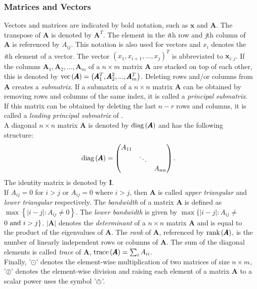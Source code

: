 \documentclass[12pt]{book}
\begin{document}
\subsubsection*{Matrices and Vectors}
Vectors and matrices are indicated by bold notation, such as $\pmb{x}$ and $\pmb{A}$. The transpose of $\pmb{A}$ is denoted by $\pmb{A}^T$. The element in the \textit{i}th row and \textit{j}th column of $\pmb{A}$ is referenced by $A_{ij}$. This notation is also used for vectors and $x_i$ denotes the \textit{i}th element of a vector. The vector $\left(x_1,x_{i+1},...,x_j\right)^T$ is abbreviated to $\pmb{x}_{i:j}$. If the columns $\pmb{A}_1, \pmb{A}_2,...,\pmb{A}_m$ of a $n\times m$ matrix $\pmb{A}$ are stacked on top of each other, this is denoted by $\hbox{vec}\left(\pmb{A}\right)=\left(\pmb{A}_1^T,\pmb{A}_2^2,...,\pmb{A}_m^T\right)$. Deleting rows and/or columns from $\pmb{A}$ creates a \textit{submatrix}. If a submatrix of a $n\times n$ matrix $\pmb{A}$ can be obtained by removing rows and columns of the same index, it is called a \textit{principal submatrix}. If this matrix can be obtained by deleting the last $n-r$ rows and columns, it is called a \textit{leading principal submatrix} of . \\
A diagonal $n\times n$ matrix $\pmb{A}$ is denoted by $\hbox{diag}\left(\pmb{A}\right)$ and has the following structure:
\begin{equation*}
    \hbox{diag}\left(\pmb{A}\right)=\begin{pmatrix}
    A_{11} \\
    & \ddots \\
    &&A_{nn}
    \end{pmatrix}.
\end{equation*}
The identity matrix is denoted by $\pmb{I}$. \\
If $A_{ij}=0$ for $i>j$ or $A_{ij} = 0$ where $i>j$, then $\pmb{A}$ is called \textit{upper triangular} and \textit{lower triangular} respectively. The \textit{bandwidth} of a matrix $\pmb{A}$ is defined as $\max\left\lbrace|i-j|:A_{ij}\neq0\right\rbrace$. The \textit{lower bandwidth} is given by $\max\lbrace|i-j|:A_{ij}\neq $ $0\hbox{ and } i > j\rbrace$. $|\pmb{A}|$ denotes the \textit{determinant} of a $n\times n$ matrix $\pmb{A}$ and is equal to the product of the eigenvalues of $\pmb{A}$. The \textit{rank} of $\pmb{A}$, referenced by $\hbox{rank}\left(\pmb{A}\right)$, is the number of linearly independent rows or columns of $\pmb{A}$. The sum of the diagonal elements is called \textit{trace} of $\pmb{A}$, $\hbox{trace}\left(\pmb{A}\right)=\sum_{i}A_{ii}$.\\
Finally, '$\odot$' denotes the element-wise multiplication of two matrices of size $n\times m$, '$\oslash$' denotes the element-wise division and raising each element of a matrix $\pmb{A}$ to a scalar power uses the symbol '$\owedge$'.
\end{document}
